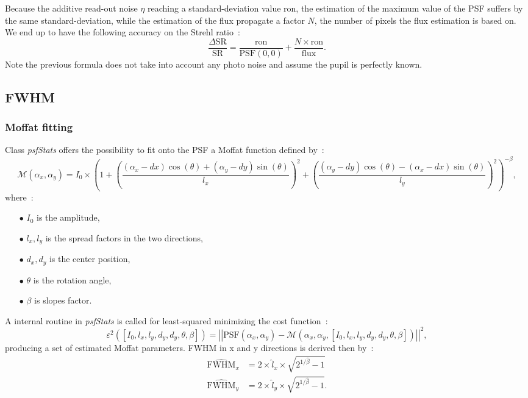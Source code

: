 \documentclass[12pt]{article}
\newcommand{\norme}[1]{\left\vert\left\vert #1 \right\vert\right\vert}
\newcommand{\para}[1]{\left(#1\right)}
\newcommand{\cro}[1]{\left[#1\right]}
\begin{document}
Because the additive read-out noise $\eta$ reaching a standard-deviation value $\text{ron}$, the estimation of the maximum value of the PSF suffers by the same standard-deviation, while the estimation of the flux propagate a factor $N$, the number of pixels the flux estimation is based on. We end up to have the following accuracy on the Strehl ratio~:
\begin{equation}
\dfrac{\Delta  \text{SR}}{\text{SR}}  = \dfrac{\text{ron}}{\text{PSF}(0,0)} + \dfrac{ N\times \text{ron}}{\text{flux}}.
\end{equation}
Note the previous formula does not take into account any photo noise and assume the pupil is perfectly known.

\subsection{FWHM}
\subsubsection{Moffat fitting}
Class \emph{psfStats} offers the possibility to fit onto the PSF a Moffat function defined by~:
\begin{equation}
	\mathcal{M}(\alpha_x,\alpha_y) = I_0\times\para{1 + \para{\dfrac{(\alpha_x-dx)\cos(\theta) + (\alpha_y-dy)\sin(\theta)}{l_x}}^2 + \para{\dfrac{(\alpha_y-dy)\cos(\theta) - (\alpha_x-dx)\sin(\theta)}{l_y}}^2}^{-\beta},
\end{equation}
where~:
\begin{itemize}
	\item[$\bullet$] $I_0$ is the amplitude,
	\item[$\bullet$] $l_x,l_y$ is the spread factors in the two directions,
	\item[$\bullet$] $d_x,d_y$ is the center position,
	\item[$\bullet$] $\theta$ is the rotation angle,
	\item[$\bullet$] $\beta$ is slopes factor.
\end{itemize}

A internal routine in \emph{psfStats} is called for least-squared minimizing the cost function~:
\begin{equation}
	\varepsilon^2\para{\cro{I_0,l_x,l_y,d_y,d_y,\theta,\beta}} = \norme{\text{PSF}\para{\alpha_x,\alpha_y} - \mathcal{M}\para{\alpha_x,\alpha_y,\cro{I_0,l_x,l_y,d_y,d_y,\theta,\beta}}}^2,
\end{equation}
producing a set of estimated Moffat parameters. FWHM in x and y directions is derived then by~:
\begin{equation}
	\begin{aligned}
			\widehat{\text{FWHM}}_x &= 2\times \widehat{l}_x\times\sqrt{2^{1/\widehat{\beta}}-1}\\
			\widehat{\text{FWHM}}_y &= 2\times \widehat{l}_y\times\sqrt{2^{1/\widehat{\beta}}-1}.
	\end{aligned}
\end{equation}
\end{document}
